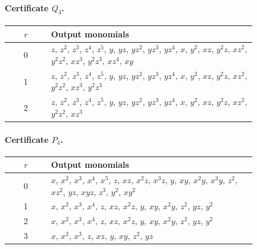 \documentclass[11pt]{amsart}
\theoremstyle{definition}
\theoremstyle{remark}
\numberwithin{equation}{section}
\begin{document}
\paragraph{Certificate $Q_{3}$.}\mbox{}
\begin{center}
\begin{tabular}{cp{0.83\linewidth}}
$r$ & Output monomials\\\hline
0 & \(z\), \(z^{2}\), \(z^{3}\), \(z^{4}\), \(z^{5}\), \(y\), \(yz\), \(yz^{2}\), \(yz^{3}\), \(yz^{4}\), \(x\), \(y^{2}\), \(xz\), \(y^{2}z\), \(xz^{2}\), \(y^{2}z^{2}\), \(xz^{3}\), \(y^{2}z^{3}\), \(xz^{4}\), \(xy\)\\
1 & \(z\), \(z^{2}\), \(z^{3}\), \(z^{4}\), \(z^{5}\), \(y\), \(yz\), \(yz^{2}\), \(yz^{3}\), \(yz^{4}\), \(x\), \(y^{2}\), \(xz\), \(y^{2}z\), \(xz^{2}\), \(y^{2}z^{2}\), \(xz^{3}\), \(y^{2}z^{3}\)\\
2 & \(z\), \(z^{2}\), \(z^{3}\), \(z^{4}\), \(z^{5}\), \(y\), \(yz\), \(yz^{2}\), \(yz^{3}\), \(yz^{4}\), \(x\), \(y^{2}\), \(xz\), \(y^{2}z\), \(xz^{2}\), \(y^{2}z^{2}\), \(xz^{3}\)\\
\end{tabular}
\end{center}

\paragraph{Certificate $P_{4}$.}\mbox{}
\begin{center}
\begin{tabular}{cp{0.83\linewidth}}
$r$ & Output monomials\\\hline
0 & \(x\), \(x^{2}\), \(x^{3}\), \(x^{4}\), \(x^{5}\), \(z\), \(xz\), \(x^{2}z\), \(x^{3}z\), \(y\), \(xy\), \(x^{2}y\), \(x^{3}y\), \(z^{2}\), \(xz^{2}\), \(yz\), \(xyz\), \(z^{3}\), \(y^{2}\), \(xy^{2}\)\\
1 & \(x\), \(x^{2}\), \(x^{3}\), \(x^{4}\), \(z\), \(xz\), \(x^{2}z\), \(y\), \(xy\), \(x^{2}y\), \(z^{2}\), \(yz\), \(y^{2}\)\\
2 & \(x\), \(x^{2}\), \(x^{3}\), \(x^{4}\), \(z\), \(xz\), \(x^{2}z\), \(y\), \(xy\), \(x^{2}y\), \(z^{2}\), \(yz\), \(y^{2}\)\\
3 & \(x\), \(x^{2}\), \(x^{3}\), \(z\), \(xz\), \(y\), \(xy\), \(z^{2}\), \(yz\)\\
\end{tabular}
\end{center}
\end{document}
